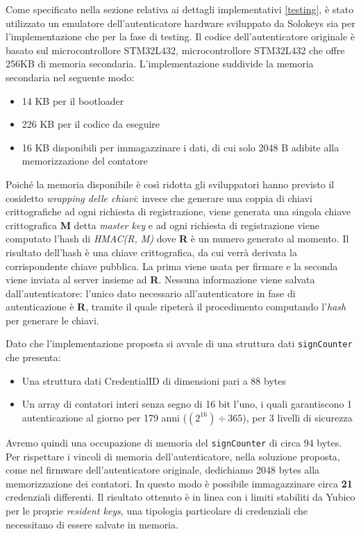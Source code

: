 Come specificato nella sezione relativa ai dettagli implementativi \ref{testing}, è stato utilizzato un emulatore dell'autenticatore hardware sviluppato da Solokeys sia per l'implementazione che per la fase di testing. Il codice dell'autenticatore originale è basato sul microcontrollore STM32L432, microcontrollore STM32L432 che offre 256KB di memoria secondaria. L'implementazione suddivide la memoria secondaria nel seguente modo:
\begin{itemize}
	\item 14 KB per il bootloader
	\item 226 KB per il codice da eseguire
	\item 16 KB disponibili per immagazzinare i dati, di cui solo 2048 B adibite alla memorizzazione del contatore
\end{itemize}

Poiché la memoria disponibile è così ridotta gli sviluppatori hanno previsto il cosidetto \emph{wrapping delle chiavi}: invece che generare una coppia di chiavi crittografiche ad ogni richiesta di registrazione, viene generata una singola chiave crittografica \textbf{M} detta \emph{master key} e ad ogni richiesta di registrazione viene computato l'hash di \emph{HMAC(R, M)} dove \textbf{R} è un numero generato al momento. Il risultato dell'hash è una chiave crittografica, da cui verrà derivata la corrispondente chiave pubblica. La prima viene usata per firmare e la seconda viene inviata al server insieme ad \textbf{R}. Nessuna informazione viene salvata dall'autenticatore: l'unico dato necessario all'autenticatore in fase di autenticazione è \textbf{R}, tramite il quale ripeterà il procedimento computando l'\emph{hash} per generare le chiavi. 

Dato che l'implementazione proposta si avvale di una struttura dati \verb*|signCounter| che presenta:
\begin{itemize}
	\item Una struttura dati CredentialID di dimensioni pari a $88$ bytes
	\item Un array di contatori interi senza segno di 16 bit l'uno, i quali garantiscono 1 autenticazione al giorno per 179 anni ($(2^{16}) \div 365$), per 3 livelli di sicurezza
\end{itemize}


Avremo quindi una occupazione di memoria del \verb*|signCounter| di circa $94$ bytes. Per rispettare i vincoli di memoria dell'autenticatore, nella soluzione proposta, come nel firmware dell'autenticatore originale, dedichiamo 2048 bytes alla memorizzazione dei contatori. In questo modo è possibile immagazzinare circa \textbf{21} credenziali differenti. Il risultato ottenuto è in linea con i limiti stabiliti \cite{yubico:resident} da Yubico per le proprie \emph{resident keys}, una tipologia particolare di credenziali che necessitano di essere salvate in memoria.


